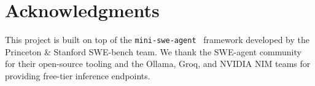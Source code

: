 \documentclass[11pt]{article}
\begin{document}
\section*{Acknowledgments}

This project is built on top of the
\texttt{mini-swe-agent}~\citep{yang2024sweagent} framework developed by the
Princeton \& Stanford SWE-bench team.  We thank the SWE-agent community for
their open-source tooling and the Ollama, Groq, and NVIDIA NIM teams for
providing free-tier inference endpoints.


\end{document}
